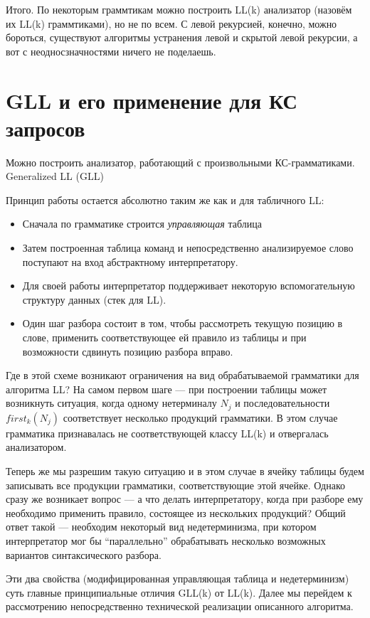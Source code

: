 Итого. По некоторым граммтикам можно построить LL(k) анализатор (назовём их LL(k) граммтиками), но не по всем.
С левой рекурсией, конечно, можно бороться, существуют алгоритмы устранения левой и скрытой левой рекурсии, а вот с неодносзначностями ничего не поделаешь.



\section{GLL и его применение для КС запросов}

Можно построить анализатор, работающий с произвольными КС-грамматиками.
Generalized LL (GLL)~\cite{Scott:2010:GP:1860132.1860320,10.1007/978-3-662-46663-6_5}

Принцип работы остается абсолютно таким же как и для табличного LL: 
\begin{itemize}
  \item Сначала по грамматике строится \textit{управляющая} таблица
  \item Затем построенная таблица команд и непосредственно анализируемое слово поступают на вход абстрактному интерпретатору.
  \item Для своей работы интерпретатор поддерживает некоторую вспомогательную структуру данных (стек для LL).
  \item Один шаг разбора состоит в том, чтобы рассмотреть текущую позицию в слове, применить соответствующее ей правило из таблицы и при возможности сдвинуть позицию разбора вправо.
\end{itemize}

Где в этой схеме возникают ограничения на вид обрабатываемой грамматики для алгоритма LL? На самом первом шаге --- при построении таблицы может возникнуть ситуация, когда одному нетерминалу $N_j$ и последовательности $first_k(N_j)$ соответствует несколько продукций грамматики. В этом случае грамматика признавалась не соответствующей классу LL(k) и отвергалась анализатором.

Теперь же мы разрешим такую ситуацию и в этом случае в ячейку таблицы будем записывать все продукции грамматики, соответствующие этой ячейке. Однако сразу же возникает вопрос --- а что делать интерпретатору, когда при разборе ему необходимо применить правило, состоящее из нескольких продукций? Общий ответ такой --- необходим некоторый вид недетерминизма, при котором интерпретатор мог бы ``параллельно'' обрабатывать несколько возможных вариантов синтаксического разбора.

Эти два свойства (модифицированная управляющая таблица и недетерминизм) суть главные принципиальные отличия GLL(k) от LL(k). Далее мы перейдем к рассмотрению непосредственно технической реализации описанного алгоритма.


